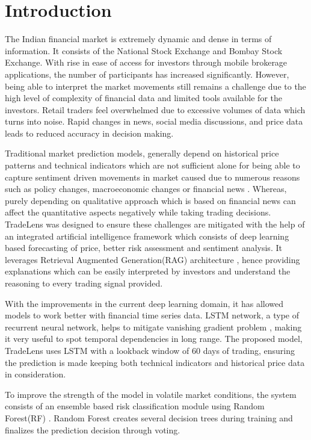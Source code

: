 \documentclass[twocolumn]{article}
\begin{document}
\section{Introduction}
The Indian financial market is extremely dynamic and dense in terms of information. It consists of the National Stock Exchange and Bombay Stock Exchange. With rise in ease of access for investors through mobile brokerage applications, the number of participants has increased significantly. However, being able to interpret the market movements still remains a challenge due to the high level of complexity of financial data and limited tools available for the investors. Retail traders feel overwhelmed due to excessive volumes of data which turns into noise. Rapid changes in news, social media discussions, and price data leads to reduced accuracy in decision making.

Traditional market prediction models, generally depend on historical price patterns and technical indicators which are not sufficient alone for being able to capture sentiment driven movements in market caused due to numerous reasons such as policy changes, macroeconomic changes or financial news \cite{bollen2011twitter}. Whereas, purely depending on qualitative approach which is based on financial news can affect the quantitative aspects negatively while taking trading decisions. TradeLens was designed to ensure these challenges are mitigated with the help of an integrated artificial intelligence framework which consists of deep learning based forecasting of price, better risk assessment and sentiment analysis. It leverages Retrieval Augmented Generation(RAG) architecture \cite{lewis2020rag}, hence providing explanations which can be easily interpreted by investors and understand the reasoning to every trading signal provided. 

With the improvements in the current deep learning domain, it has allowed models to work better with financial time series data. LSTM network, a type of recurrent neural network, helps to mitigate vanishing gradient problem \cite{hochreiter1997lstm}, making it very useful to spot temporal dependencies in long range. The proposed model, TradeLens uses LSTM with a lookback window of 60 days of trading, ensuring the prediction is made keeping both technical indicators and historical price data in consideration. 

To improve the strength of the model in volatile market conditions, the system consists of an ensemble based risk classification module using Random Forest(RF) \cite{breiman2001rf}. Random Forest creates several decision trees during training and finalizes the prediction decision through voting.
\end{document}
